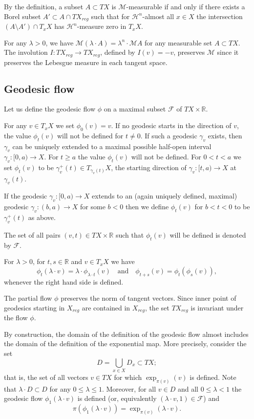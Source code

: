 \documentclass[12pt,leqno,intlimits]{amsart}
\numberwithin{equation}{section}
\theoremstyle{definition}
\theoremstyle{remark}
\newcommand{\R}{\mathbb{R}}
\def\:{\colon}
\begin{document}
By the definition, a subset $A\subset TX$ is $\mathcal M$-measurable if and only if there exists a Borel subset $A'\subset A\cap TX_{reg}$ such that
for $\mathcal H^n$-almost all $x\in X$ the intersection $(A\setminus A') \cap T_xX$ has $\mathcal H^n$-measure zero in $T_xX$.

For any $\lambda>0$, we have $\mathcal M(\lambda\cdot A)=\lambda^n\cdot\mathcal MA$ for any measurable set $A\subset TX$.
The involution $I\:TX_{reg}\to TX_{reg}$, defined by $I(v)=-v$,
preserves $\mathcal M$
since it preserves the Lebesgue measure in each tangent space.


\subsection{Geodesic flow}
Let us define the geodesic flow $\phi$ on a maximal subset $\mathcal F$ of $TX\times\R$.

For any $v\in T_xX$ we set $\phi _0(v)=v$.
If no geodesic starts in the direction of $v$,
the value $\phi _t(v)$ will not be defined for $t\neq 0$. If such a geodesic $\gamma_v$ exists, then $\gamma_v$ can be uniquely extended to a maximal possible half-open interval $\gamma_v \:[0,a)\to X$. For $t\geq a$
the value $\phi _t(v)$ will not be defined. For $0<t<a$ we set $\phi _t(v)$ to be $\gamma _v ^+ (t) \in T_{\gamma _v(t)} X$, the starting direction of $\gamma_v\:[t,a) \to X$ at $\gamma_v (t)$.

If the geodesic $\gamma _v\:[0,a)\to X$ extends to an (again uniquely defined, maximal) geodesic $\gamma_v\:(b,a) \to X$ for some $b<0$
then we define $\phi _t(v)$ for $b<t<0$ to be $\gamma_v ^+ (t) $ as above.

The set of all pairs $(v,t)\in TX\times\R$ such that $\phi_t(v)$ will be defined is denoted by $\mathcal F$.

For $\lambda >0$, for $t,s\in \R$ and $v\in T_x X$ we have
$$\phi _t(\lambda \cdot v) =\lambda \cdot \phi _{\lambda \cdot t} (v)
\quad\text{and}\quad 
\phi _{t+s} (v) =\phi _t ( \phi _s (v)),$$
whenever the right hand side is defined.

The partial flow $\phi$ preserves the norm of tangent vectors. Since inner point of geodesics starting in $X_{reg}$ are contained in $X_{reg}$, the set $TX_{reg}$ is invariant under the flow $\phi$.

By construction, the domain of the definition of the geodesic flow almost includes the domain of the definition of the exponential map.
More precisely, consider the set
\[D=\bigcup_{x\in X} D_x\subset TX;\]
that is, the set of all vectors $v\in TX$ for which $\exp _{\pi(v)} (v)$ is defined.
Note that $\lambda\cdot D\subset D$ for any $0\leq \lambda \leq 1$.
Moreover, for all $v\in D$ and all $0\leq \lambda <1$
the geodesic flow $\phi_1(\lambda\cdot v)$ is defined (or, equivalently $(\lambda\cdot v,1)\in \mathcal F$) and 
\[\pi(\phi_1 (\lambda\cdot  v))= \exp _{\pi (v)} (\lambda\cdot  v).\]
\end{document}
